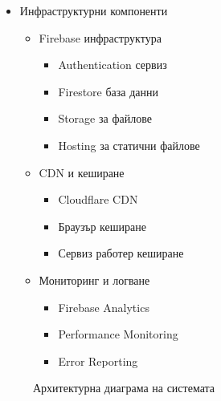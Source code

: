 \documentclass[12pt,a4paper]{article}
\begin{document}
\begin{itemize}
    \item Инфраструктурни компоненти
    \begin{itemize}
        \item Firebase инфраструктура
        \begin{itemize}
            \item Authentication сервиз
            \item Firestore база данни
            \item Storage за файлове
            \item Hosting за статични файлове
        \end{itemize}
        \item CDN и кеширане
        \begin{itemize}
            \item Cloudflare CDN
            \item Браузър кеширане
            \item Сервиз работер кеширане
        \end{itemize}
        \item Мониторинг и логване
        \begin{itemize}
            \item Firebase Analytics
            \item Performance Monitoring
            \item Error Reporting
        \end{itemize}
    \end{itemize}
\end{itemize}

\begin{figure}[h]
\centering
\caption{Архитектурна диаграма на системата}
\end{figure}
\end{document}
